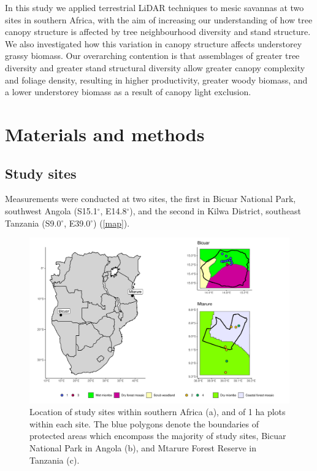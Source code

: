 \documentclass[11pt,a4paper]{article}
\begin{document}
In this study we applied terrestrial LiDAR techniques to mesic savannas at two sites in southern Africa, with the aim of increasing our understanding of how tree canopy structure is affected by tree neighbourhood diversity and stand structure. We also investigated how this variation in canopy structure affects understorey grassy biomass. Our overarching contention is that assemblages of greater tree diversity and greater stand structural diversity allow greater canopy complexity and foliage density, resulting in higher productivity, greater woody biomass, and a lower understorey biomass as a result of canopy light exclusion. 

\section{Materials and methods}

\subsection{Study sites}

Measurements were conducted at two sites, the first in Bicuar National Park, southwest Angola (S15.1$^\circ$, E14.8$^\circ$), and the second in Kilwa District, southeast Tanzania (S9.0$^\circ$, E39.0$^\circ$) (\autoref{map}).

\begin{figure}[H]
\centering
	\includegraphics[width=\textwidth]{map}
	\caption{Location of study sites within southern Africa (a), and of 1 ha plots within each site. The blue polygons denote the boundaries of protected areas which encompass the majority of study sites, Bicuar National Park in Angola (b), and Mtarure Forest Reserve in Tanzania (c).}
	\label{map}
\end{figure}
\end{document}
